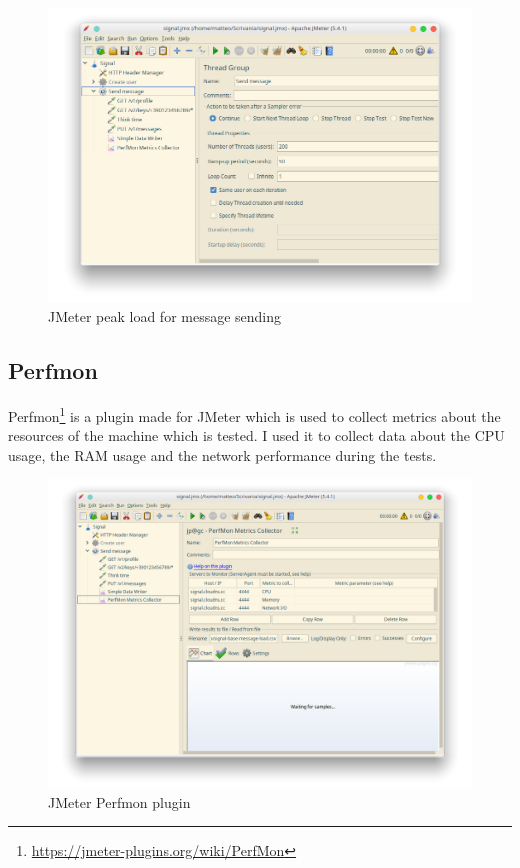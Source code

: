 \begin{figure}[H]
    \centering
    \includegraphics[width=\textwidth]{images/jmeter-peak-message}
    \caption{JMeter peak load for message sending}
    \label{fig:jmeterhighloadmessage}
\end{figure}

\subsection{Perfmon\label{sec:perfmon}}

Perfmon\footnote{\url{https://jmeter-plugins.org/wiki/PerfMon}} is a plugin made for JMeter which is used to collect metrics about the resources of the machine which is tested.
I used it to collect data about the CPU usage, the RAM usage and the network performance during the tests.

\begin{figure}[H]
    \centering
    \includegraphics[width=\textwidth]{images/perfmon}
    \caption{JMeter Perfmon plugin}
    \label{fig:jmeterperfmon}
\end{figure}


